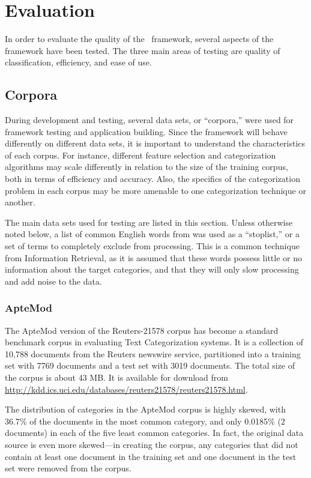 \chapter{Evaluation}

In order to evaluate the quality of the \aicat\ framework, several
aspects of the framework have been tested.  The three main areas of
testing are quality of classification, efficiency, and ease of use.


\section{Corpora}

During development and testing, several data sets, or ``corpora,''
were used for framework testing and application building.  Since the
framework will behave differently on different data sets, it is
important to understand the characteristics of each corpus.  For
instance, different feature selection and categorization algorithms
may scale differently in relation to the size of the training corpus,
both in terms of efficiency and accuracy.\cite{chakrabarti:98} Also,
the specifics of the categorization problem in each corpus may be more
amenable to one categorization technique or another.

The main data sets used for testing are listed in this section.
Unless otherwise noted below, a list of common English words from
\cite{salton:89} was used as a ``stoplist,'' or a set of terms to
completely exclude from processing.  This is a common technique from
Information Retrieval,\cite{XXX} as it is assumed that these words
possess little or no information about the target categories, and that
they will only slow processing and add noise to the data.


\subsection{ApteMod}


The ApteMod version of the Reuters-21578 corpus has become a
standard benchmark corpus in evaluating Text Categorization
systems.\cite{yang:99} It is a collection of 10,788 documents from the
Reuters newswire service, partitioned into a training set with 7769
documents and a test set with 3019 documents.  The total size of the
corpus is about 43 MB.  It is available for download from
\url{http://kdd.ics.uci.edu/databases/reuters21578/reuters21578.html}.

The distribution of categories in the ApteMod corpus is highly skewed,
with 36.7\% of the documents in the most common category, and only
0.0185\% (2 documents) in each of the five least common categories.
In fact, the original data source is even more skewed---in creating
the corpus, any categories that did not contain at least one document
in the training set and one document in the test set were removed from
the corpus.\cite{yang:99}

